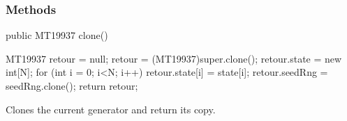 \subsubsection* {Methods}
\begin{code}
   public MT19937 clone() \begin{hide} {
      MT19937 retour = null;
      retour = (MT19937)super.clone();
      retour.state = new int[N];
      for (int i = 0; i<N; i++) {
         retour.state[i] = state[i];
      }
      retour.seedRng = seedRng.clone();
      return retour;
   }\end{hide}
\end{code}
 \begin{tabb} Clones the current generator and return its copy.
 \end{tabb}
 \begin{htmlonly}
\end{htmlonly}
